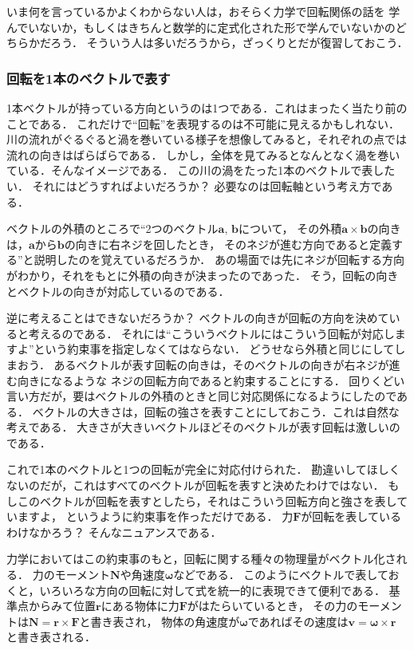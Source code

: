 いま何を言っているかよくわからない人は，おそらく力学で回転関係の話を
学んでいないか，もしくはきちんと数学的に定式化された形で学んでいないかのどちらかだろう．
そういう人は多いだろうから，ざっくりとだが復習しておこう．
\subsubsection{回転を1本のベクトルで表す}
1本ベクトルが持っている方向というのは1つである．これはまったく当たり前のことである．
これだけで``回転''を表現するのは不可能に見えるかもしれない．
川の流れがぐるぐると渦を巻いている様子を想像してみると，それぞれの点では流れの向きはばらばらである．
しかし，全体を見てみるとなんとなく渦を巻いている．そんなイメージである．
この川の渦をたった1本のベクトルで表したい．
それにはどうすればよいだろうか？ 必要なのは回転軸という考え方である．

ベクトルの外積のところで``2つのベクトル$\bm{a}, \, \bm{b}$について，
その外積$\bm{a} \times \bm{b}$の向きは，$\bm{a}$から$\bm{b}$の向きに右ネジを回したとき，
そのネジが進む方向であると定義する''と説明したのを覚えているだろうか．
あの場面では先にネジが回転する方向がわかり，それをもとに外積の向きが決まったのであった．
そう，回転の向きとベクトルの向きが対応しているのである．

逆に考えることはできないだろうか？ ベクトルの向きが回転の方向を決めていると考えるのである．
それには``こういうベクトルにはこういう回転が対応しますよ''という約束事を指定しなくてはならない．
どうせなら外積と同じにしてしまおう．
あるベクトルが表す回転の向きは，そのベクトルの向きが右ネジが進む向きになるような
ネジの回転方向であると約束することにする．
回りくどい言い方だが，要はベクトルの外積のときと同じ対応関係になるようにしたのである．
ベクトルの大きさは，回転の強さを表すことにしておこう．これは自然な考えである．
大きさが大きいベクトルほどそのベクトルが表す回転は激しいのである．

これで1本のベクトルと1つの回転が完全に対応付けられた．
勘違いしてほしくないのだが，これはすべてのベクトルが回転を表すと決めたわけではない．
もしこのベクトルが回転を表すとしたら，それはこういう回転方向と強さを表していますよ，
というように約束事を作っただけである．
力$\bm{F}$が回転を表しているわけなかろう？ そんなニュアンスである．

力学においてはこの約束事のもと，回転に関する種々の物理量がベクトル化される．
力のモーメント$\bm{N}$や角速度$\bm{\omega}$などである．
このようにベクトルで表しておくと，いろいろな方向の回転に対して式を統一的に表現できて便利である．
基準点からみて位置$\bm{r}$にある物体に力$\bm{F}$がはたらいているとき，
その力のモーメントは$\bm{N}=\bm{r}\times\bm{F}$と書き表され，
物体の角速度が$\bm{\omega}$であればその速度は$\bm{v}=\bm{\omega}\times\bm{r}$
と書き表される．

